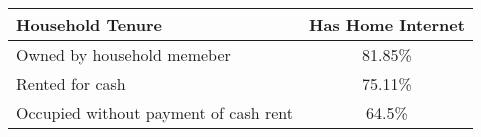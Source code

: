 \documentclass{article}
\begin{document}
\begin{table}[ht]
\centering
\begin{tabular}{lc}
  \hline
 Household Tenure & Has Home Internet \\ 
  \hline
  Owned by household memeber & 81.85\% \\ 
  Rented for cash & 75.11\% \\ 
  Occupied without payment of cash rent & 64.5\% \\ 
   \hline
\end{tabular}
\end{table}
\end{document}
